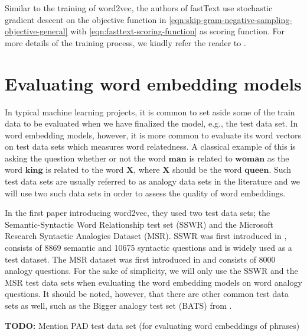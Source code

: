 Similar to the training of word2vec, the authors of fastText use stochastic gradient descent on the objective function in \cref{eqn:skip-gram-negative-sampling-objective-general} with \cref{eqn:fasttext-scoring-function} as scoring function. For more details of the training process, we kindly refer the reader to \cite[4 Experimental setup]{bojanowski2017enriching}.

\section{Evaluating word embedding models}
\label{sec:eval-word2vec-model}
In typical machine learning projects, it is common to set aside some of the train data to be evaluated when we have finalized the model, e.g., the test data set. In word embedding models, however, it is more common to evaluate its word vectors on test data sets which measures word relatedness. A classical example of this is asking the question whether or not the word $\textbf{man}$ is related to $\textbf{woman}$ as the word $\textbf{king}$ is related to the word $\textbf{X}$, where $\textbf{X}$ should be the word $\textbf{queen}$. Such test data sets are usually referred to as analogy data sets in the literature and we will use two such data sets in order to assess the quality of word embeddings.

In the first paper introducing word2vec, they used two test data sets; the Semantic-Syntactic Word Relationship test set (SSWR) and the Microsoft Research Syntactic Analogies Dataset (MSR). SSWR was first introduced in \cite{mikolov2013a}, consists of 8869 semantic and 10675 syntactic questions and is widely used as a test dataset. The MSR dataset was first introduced in \cite{mikolov-etal-2013-linguistic} and consists of 8000 analogy questions. For the sake of simplicity, we will only use the SSWR and the MSR test data sets when evaluating the word embedding models on word analogy questions. It should be noted, however, that there are other common test data sets as well, such as the Bigger analogy test set (BATS) from \cite{gladkova-etal-2016-analogy}.

\textbf{TODO:} Mention PAD test data set (for evaluating word embeddings of phrases)